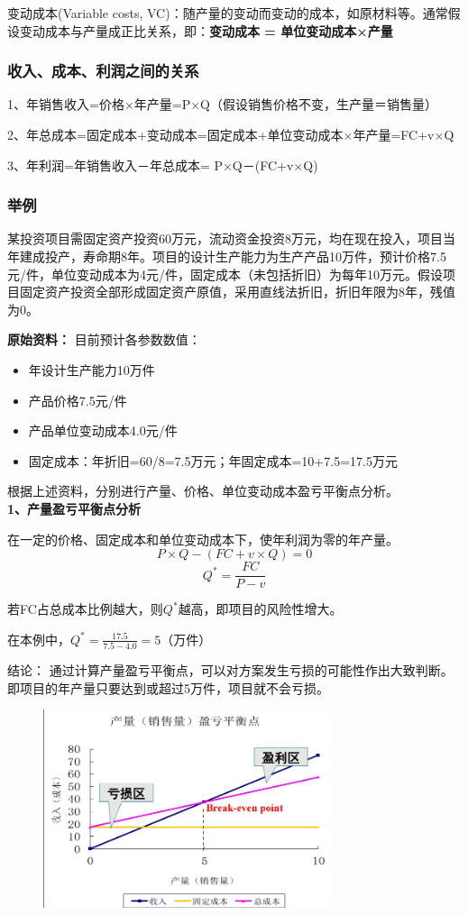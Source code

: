 变动成本(Variable costs, VC)：随产量的变动而变动的成本，如原材料等。通常假设变动成本与产量成正比关系，即：\textbf{变动成本 = 单位变动成本×产量}

\subsubsection{收入、成本、利润之间的关系}
1、年销售收入=价格×年产量=P×Q（假设销售价格不变，生产量＝销售量）

2、年总成本=固定成本+变动成本=固定成本+单位变动成本×年产量=FC+v×Q 

3、年利润=年销售收入－年总成本= P×Q－(FC+v×Q)\\


\subsubsection{举例}
某投资项目需固定资产投资60万元，流动资金投资8万元，均在现在投入，项目当年建成投产，寿命期8年。项目的设计生产能力为生产产品10万件，预计价格7.5元/件，单位变动成本为4元/件，固定成本（未包括折旧）为每年10万元。假设项目固定资产投资全部形成固定资产原值，采用直线法折旧，折旧年限为8年，残值为0。

\textbf{原始资料：}
目前预计各参数数值：
\begin{itemize}
    \item 年设计生产能力10万件
    \item 产品价格7.5元/件
    \item 产品单位变动成本4.0元/件
    \item 固定成本：年折旧=60/8=7.5万元；年固定成本=10+7.5=17.5万元
\end{itemize}

根据上述资料，分别进行产量、价格、单位变动成本盈亏平衡点分析。\\
\textbf{1、产量盈亏平衡点分析}

在一定的价格、固定成本和单位变动成本下，使年利润为零的年产量。
$$P \times Q - (FC + v \times Q) = 0$$
$$Q^*=\frac{FC}{P-v}$$

若FC占总成本比例越大，则$Q^*$越高，即项目的风险性增大。

在本例中，$Q^*=\frac{17.5}{7.5-4.0}=5$（万件）

结论：
通过计算产量盈亏平衡点，可以对方案发生亏损的可能性作出大致判断。即项目的年产量只要达到或超过5万件，项目就不会亏损。

\begin{figure}[H]
    \centering
    \includegraphics[width=0.75\textwidth]{image/盈亏平衡分析.png}
    \label{fig:20}
\end{figure}

